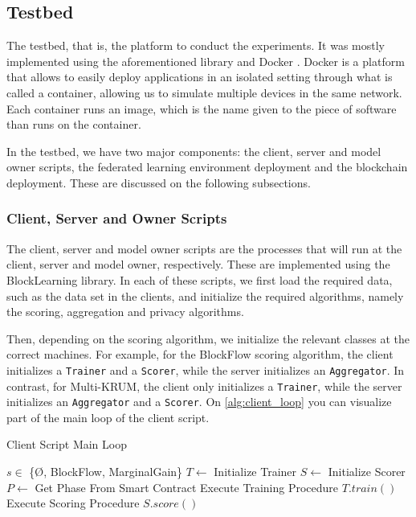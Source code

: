 \subsection{Testbed}

The testbed, that is, the platform to conduct the experiments. It was mostly implemented using the aforementioned library and Docker \cite{docker}. Docker is a platform that allows to easily deploy applications in an isolated setting through what is called a container, allowing us to simulate multiple devices in the same network. Each container runs an image, which is the name given to the piece of software than runs on the container.

In the testbed, we have two major components: the client, server and model owner scripts, the federated learning environment deployment and the blockchain deployment. These are discussed on the following subsections.

\subsubsection{Client, Server and Owner Scripts}

The client, server and model owner scripts are the processes that will run at the client, server and model owner, respectively. These are implemented using the BlockLearning library. In each of these scripts, we first load the required data, such as the data set in the clients, and initialize the required algorithms, namely the scoring, aggregation and privacy algorithms.

Then, depending on the scoring algorithm, we initialize the relevant classes at the correct machines. For example, for the BlockFlow scoring algorithm, the client initializes a \texttt{Trainer} and a \texttt{Scorer}, while the server initializes an \texttt{Aggregator}. In contrast, for Multi-KRUM, the client only initializes a \texttt{Trainer}, while the server initializes an \texttt{Aggregator} and a \texttt{Scorer}. On \autoref{alg:client_loop} you can visualize part of the main loop of the client script.

\begin{algorithm}
\caption{Client Script Main Loop}\label{alg:client_loop}
\begin{algorithmic}
\Require $s \in$ \{\O, BlockFlow, MarginalGain\}
\State $T \gets $ Initialize Trainer
    \State $S \gets $ Initialize Scorer
\EndIf
{}
    \State $P \gets$ Get Phase From Smart Contract
        \State Execute Training Procedure $T.train()$
        \State Execute Scoring Procedure $S.score()$
    \EndIf
\EndWhile
\end{algorithmic}
\end{algorithm}

